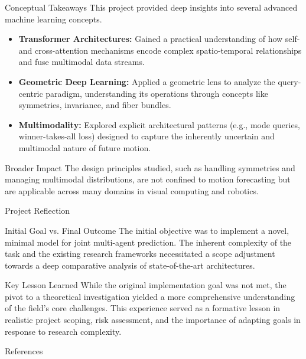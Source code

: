 \documentclass[10pt,aspectratio=169]{beamer}
\begin{document}
\begin{frame}{Conceptual Takeaways}
    This project provided deep insights into several advanced machine learning concepts.
    \begin{itemize}
        \item \textbf{Transformer Architectures:} Gained a practical understanding of how self- and cross-attention mechanisms encode complex spatio-temporal relationships and fuse multimodal data streams.
        \item \textbf{Geometric Deep Learning:} Applied a geometric lens to analyze the query-centric paradigm, understanding its operations through concepts like symmetries, invariance, and fiber bundles.
        \item \textbf{Multimodality:} Explored explicit architectural patterns (e.g., mode queries, winner-takes-all loss) designed to capture the inherently uncertain and multimodal nature of future motion.
    \end{itemize}
    \begin{block}{Broader Impact}
        The design principles studied, such as handling symmetries and managing multimodal distributions, are not confined to motion forecasting but are applicable across many domains in visual computing and robotics.
    \end{block}
\end{frame}

\begin{frame}{Project Reflection}
    \begin{block}{Initial Goal vs. Final Outcome}
        The initial objective was to implement a novel, minimal model for joint multi-agent prediction. The inherent complexity of the task and the existing research frameworks necessitated a scope adjustment towards a deep comparative analysis of state-of-the-art architectures.
    \end{block}

    \begin{alertblock}{Key Lesson Learned}
        While the original implementation goal was not met, the pivot to a theoretical investigation yielded a more comprehensive understanding of the field's core challenges. This experience served as a formative lesson in realistic project scoping, risk assessment, and the importance of adapting goals in response to research complexity.
    \end{alertblock}
\end{frame}

\begin{frame}[allowframebreaks]{References}
  
  
\end{frame}
\end{document}
